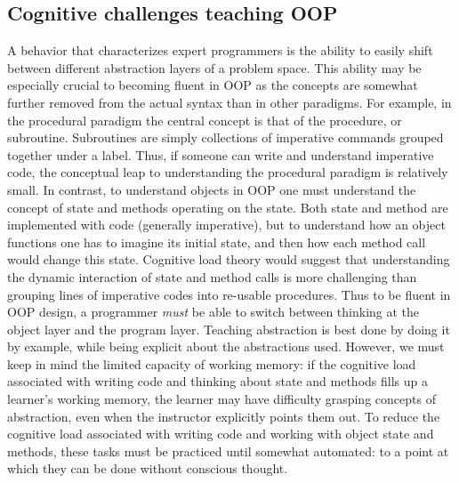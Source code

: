 \documentclass[12pt]{article}
\begin{document}
\subsection*{Cognitive challenges teaching OOP}
A behavior that characterizes expert programmers is the ability to
easily shift between different abstraction layers of a problem
space\autocite{armoni_teaching_2013}. This ability may be especially
crucial to becoming fluent in OOP as the concepts are somewhat further
removed from the actual syntax than in other paradigms. For example,
in the procedural paradigm the central concept is that of the
procedure, or subroutine. Subroutines are simply collections of
imperative commands grouped together under a label. Thus, if someone
can write and understand imperative code, the conceptual leap to
understanding the procedural paradigm is relatively small. In
contrast, to understand objects in OOP one must understand the concept
of state and methods operating on the state. Both state and method are
implemented with code (generally imperative), but to understand how an
object functions one has to imagine its initial state, and then how
each method call would change this state. Cognitive load theory would
suggest that understanding the dynamic interaction of state and method
calls is more challenging than grouping lines of imperative codes into
re-usable procedures. Thus to be fluent in OOP design, a programmer
\emph{must} be able to switch between thinking at the object layer and
the program layer. Teaching abstraction is best done by doing it by
example, while being explicit about the abstractions
used\autocite{armoni_teaching_2013}. However, we must keep in mind the
limited capacity of working memory: if the cognitive load associated
with writing code and thinking about state and methods fills up a
learner's working memory, the learner may have difficulty grasping
concepts of abstraction, even when the instructor explicitly points
them out. To reduce the cognitive load associated with writing code
and working with object state and methods, these tasks must be
practiced until somewhat automated: to a point at which they can be
done without conscious thought\autocite{ambrose_chapter_2010}.
\end{document}

